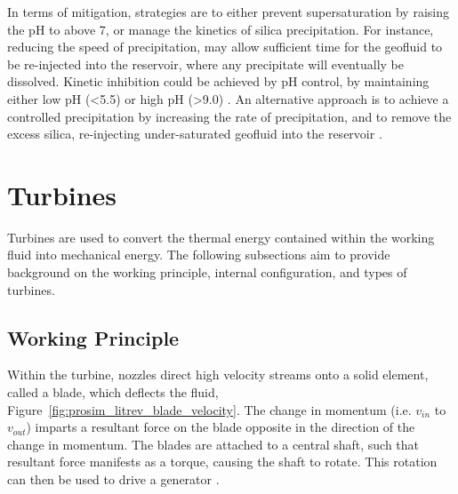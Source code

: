         In terms of mitigation, strategies are to either prevent supersaturation by raising the pH to above \num{7}, or manage the kinetics of silica precipitation. For instance, reducing the speed of precipitation, may allow sufficient time for the geofluid to be re-injected into the reservoir, where any precipitate will eventually be dissolved. Kinetic inhibition could be achieved by pH control, by maintaining either low pH (<5.5) or high pH (>9.0) \cite{DiPippo2016}. An alternative approach is to achieve a controlled precipitation by increasing the rate of precipitation, and to remove the excess silica, re-injecting under-saturated geofluid into the reservoir \cite{DiPippo2016}.
        
\section{Turbines}
\label{sec:prosim_litrev_turbine}
    Turbines are used to convert the thermal energy contained within the working fluid into mechanical energy. The following subsections aim to provide background on the working principle, internal configuration, and types of turbines. 

    \subsection{Working Principle}
        Within the turbine, nozzles direct high velocity streams onto a solid element, called a blade, which deflects the fluid, Figure~\ref{fig:prosim_litrev_blade_velocity}. The change in momentum (i.e. \(v_{in}\) to \(v_{out}\)) imparts a resultant force on the blade opposite in the direction of the change in momentum. The blades are attached to a central shaft, such that resultant force manifests as a torque, causing the shaft to rotate. This rotation can then be used to drive a generator \cite{Dick2015, Smith2005}.
    
